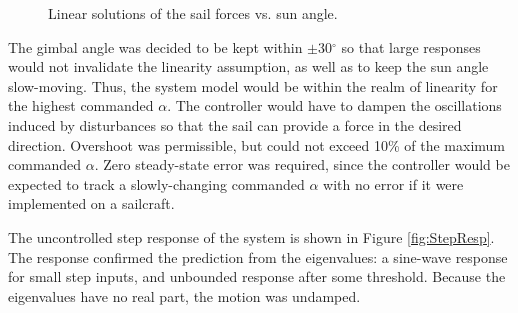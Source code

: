 \documentclass[]{aiaa-tc}%
\begin{document}
	\vspace{5 mm}
	
	\begin{figure}[H]
		\centering
		\caption{Linear solutions of the sail forces vs. sun angle. }
		\label{fig:Force_linearity}
	\end{figure}	

	\vspace{5 mm}

	The gimbal angle was decided to be kept within $\pm$30$^{\circ}$ so that large responses would not invalidate the linearity assumption, as well as to keep the sun angle slow-moving. Thus, the system model would be within the realm of linearity for the highest commanded $\alpha$. The controller would have to dampen the oscillations induced by disturbances so that the sail can provide a force in the desired direction. Overshoot was permissible, but could not exceed 10\% of the maximum commanded $\alpha$. Zero steady-state error was required, since the controller would be expected to track a slowly-changing commanded $\alpha$ with no error if it were implemented on a sailcraft. 

	\vspace{5 mm}

	The uncontrolled step response of the system is shown in Figure \ref{fig:StepResp}. The response confirmed the prediction from the eigenvalues: a sine-wave response for small step inputs, and unbounded response after some threshold. Because the eigenvalues have no real part, the motion was undamped.
\end{document}
